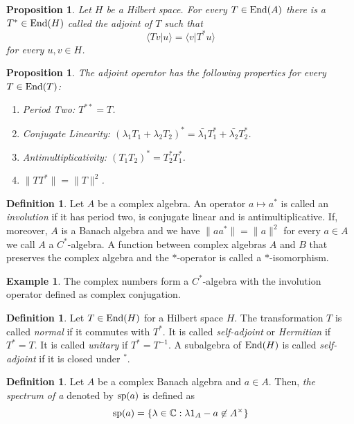 \documentclass[12pt]{article}
\newtheorem{prop}[theorem]{Proposition}
\theoremstyle{definition}
\newtheorem{dfn}[theorem]{Definition}
\newtheorem{example}[theorem]{Example}
\theoremstyle{remark}
\newcommand{\Comp}{\mathbb{C}}
\newcommand{\End}[1]{\textup{End}(#1)}
\begin{document}
    \begin{prop}
        Let $H$ be a Hilbert space. For every $T\in\End{A}$ there is a $T^*\in\End{H}$ called the \emph{adjoint of $T$} such that
        $$
        \langle Tv|u \rangle = \langle v|T^*u \rangle
        $$
        for every $u,v\in H$.
    \end{prop}

    \begin{prop}
        The adjoint operator has the following properties for every $T\in\End{T}$:
        \begin{enumerate}[label=(\roman*)]
            \item Period Two: $T^{**}=T$.
            \item Conjugate Linearity: $(\lambda_1 T_1+\lambda_2 T_2)^*=\bar{\lambda_1}T_1^*+\bar{\lambda_2}T_2^*$.
            \item Antimultiplicativity: $(T_1T_2)^*=T_2^*T_1^*$.
            \item $\|TT^*\|=\|T\|^2$.
        \end{enumerate}
    \end{prop}

    \begin{dfn}
        Let $A$ be a complex algebra. An operator $a\mapsto a^*$ is called an \emph{involution} if it has period two, is conjugate linear and is antimultiplicative. If, moreover, $A$ is a Banach algebra and we have $\|aa^*\|=\|a\|^2$ for every $a\in A$ we call $A$ a $C^*$-algebra. A function between complex algebras $A$ and $B$ that preserves the complex algebra and the $*$-operator is called a $*$-isomorphism.
    \end{dfn}
    
    \begin{example}
        The complex numbers form a $C^*$-algebra with the involution operator defined as complex conjugation.
    \end{example}

    \begin{dfn}
        Let $T\in\End{H}$ for a Hilbert space $H$. The transformation $T$ is called \emph{normal} if it commutes with $T^*$. It is called \emph{self-adjoint} or \emph{Hermitian} if $T^*=T$. It is called \emph{unitary} if $T^*=T^{-1}$. A subalgebra of $\End{H}$ is called \emph{self-adjoint} if it is closed under $^*$.
    \end{dfn}

    \begin{dfn}
        Let $A$ be a complex Banach algebra and $a\in A$. Then, \emph{the spectrum of a} denoted by $\textup{sp}(a)$ is defined as
        $$
        \textup{sp}(a) = \{\lambda\in\Comp:\lambda 1_A-a\not\in A^\times\}
        $$
    \end{dfn}
\end{document}
